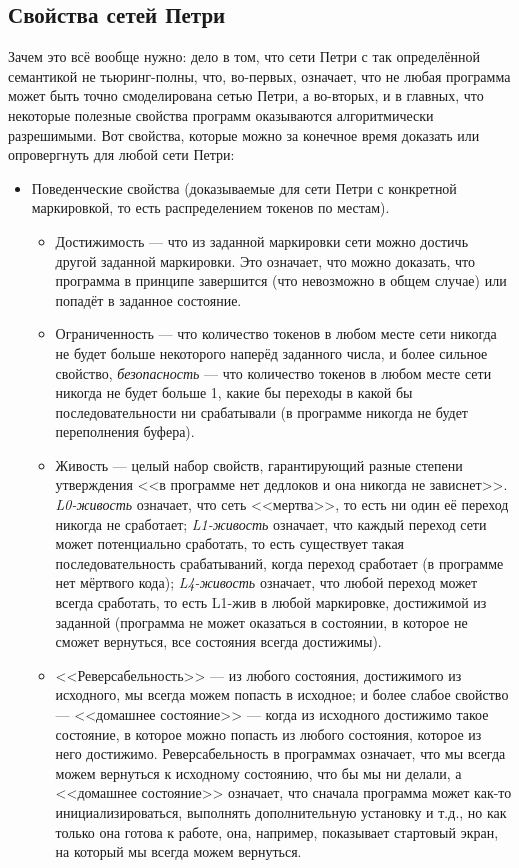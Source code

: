 \documentclass{../mcstext}
\begin{document}
\subsection{Свойства сетей Петри}

Зачем это всё вообще нужно: дело в том, что сети Петри с так определённой семантикой не тьюринг-полны, что, во-первых, означает, что не любая программа может быть точно смоделирована сетью Петри, а во-вторых, и в главных, что некоторые полезные свойства программ оказываются алгоритмически разрешимыми. Вот свойства, которые можно за конечное время доказать или опровергнуть для любой сети Петри:

\begin{itemize}
    \item Поведенческие свойства (доказываемые для сети Петри с конкретной маркировкой, то есть распределением токенов по местам).
    \begin{itemize}
        \item Достижимость --- что из заданной маркировки сети можно достичь другой заданной маркировки. Это означает, что можно доказать, что программа в принципе завершится (что невозможно в общем случае) или попадёт в заданное состояние.
        \item Ограниченность --- что количество токенов в любом месте сети никогда не будет больше некоторого наперёд заданного числа, и более сильное свойство, \textit{безопасность} --- что количество токенов в любом месте сети никогда не будет больше 1, какие бы переходы в какой бы последовательности ни срабатывали (в программе никогда не будет переполнения буфера).
        \item Живость --- целый набор свойств, гарантирующий разные степени утверждения <<в программе нет дедлоков и она никогда не зависнет>>. \textit{L0-живость} означает, что сеть <<мертва>>, то есть ни один её переход никогда не сработает; \textit{L1-живость} означает, что каждый переход сети может потенциально сработать, то есть существует такая последовательность срабатываний, когда переход сработает (в программе нет мёртвого кода); \textit{L4-живость} означает, что любой переход может всегда сработать, то есть L1-жив в любой маркировке, достижимой из заданной (программа не может оказаться в состоянии, в которое не сможет вернуться, все состояния всегда достижимы).
        \item <<Реверсабельность>> --- из любого состояния, достижимого из исходного, мы всегда можем попасть в исходное; и более слабое свойство --- <<домашнее состояние>> --- когда из исходного достижимо такое состояние, в которое можно попасть из любого состояния, которое из него достижимо. Реверсабельность в программах означает, что мы всегда можем вернуться к исходному состоянию, что бы мы ни делали, а <<домашнее состояние>> означает, что сначала программа может как-то инициализироваться, выполнять дополнительную установку и т.д., но как только она готова к работе, она, например, показывает стартовый экран, на который мы всегда можем вернуться.

\end{itemize}
\end{itemize}
\end{document}
